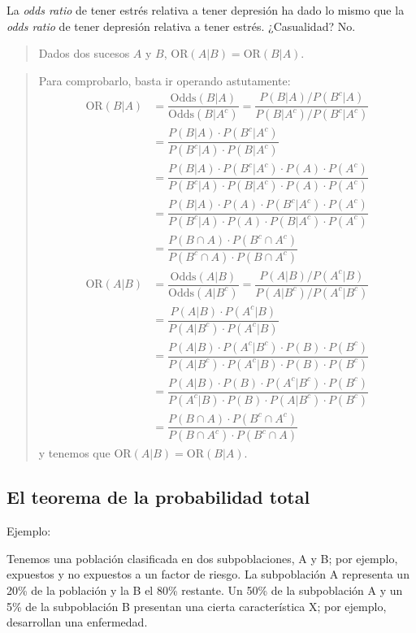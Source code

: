 \documentclass[
  spanish,
  letterpaper,
  DIV=11,
  numbers=noendperiod]{scrreprt}
\begin{document}
\begin{tcolorbox}
La \emph{odds ratio} de tener estrés relativa a tener depresión ha dado
lo mismo que la \emph{odds ratio} de tener depresión relativa a tener
estrés. ¿Casualidad? No.

\begin{quote}
Dados dos sucesos \(A\) y \(B\), \(\text{OR}(A|B)=\text{OR}(B|A)\).
\end{quote}

\begin{quote}
Para comprobarlo, basta ir operando astutamente: \[
\begin{array}{l}
\text{OR}(B|A)\!\!\!\!\! &= \dfrac{\text{Odds}(B|A)}{\text{Odds}(B|A^c)}  = \dfrac{P(B|A)/P(B^c|A)}{P(B|A^c)/P(B^c|A^c)}\\
&=\dfrac{P(B|A)\cdot P(B^c|A^c)}{P(B^c|A)\cdot P(B|A^c)}\\
& =\dfrac{P(B|A)\cdot P(B^c|A^c)\cdot P(A)\cdot P(A^c)}{P(B^c|A)\cdot P(B|A^c)\cdot P(A)\cdot P(A^c)}\\
& =\dfrac{P(B|A)\cdot P(A)\cdot P(B^c|A^c)\cdot P(A^c)}{P(B^c|A)\cdot P(A)\cdot P(B|A^c)\cdot P(A^c)}\\
& =\dfrac{P(B\cap A)\cdot P(B^c\cap A^c)}{P(B^c\cap A)\cdot P(B\cap A^c)}\\
\text{OR}(A|B) & = \dfrac{\text{Odds}(A|B)}{\text{Odds}(A|B^c)} =\dfrac{P(A|B)/P(A^c|B)}{P(A|B^c)/P(A^c|B^c)}\\
& =\dfrac{P(A|B)\cdot P(A^c|B)}{P(A|B^c)\cdot P(A^c|B)}\\
& =\dfrac{P(A|B)\cdot P(A^c|B^c)\cdot P(B)\cdot P(B^c)}{P(A|B^c)\cdot P(A^c|B)\cdot P(B)\cdot P(B^c)}\\
& =\dfrac{P(A|B)\cdot P(B)\cdot P(A^c|B^c)\cdot P(B^c)}{P(A^c|B)\cdot P(B)\cdot P(A|B^c)\cdot P(B^c)}\\
& =\dfrac{P(B\cap A)\cdot P(B^c\cap A^c)}{P(B\cap A^c)\cdot P(B^c\cap A)}
\end{array}
\] y tenemos que \(\text{OR}(A|B)=\text{OR}(B|A)\).
\end{quote}

\subsection{El teorema de la probabilidad
total}\label{el-teorema-de-la-probabilidad-total}

Ejemplo:

Tenemos una población clasificada en dos subpoblaciones, A y B; por
ejemplo, expuestos y no expuestos a un factor de riesgo. La subpoblación
A representa un 20\% de la población y la B el 80\% restante. Un 50\% de
la subpoblación A y un 5\% de la subpoblación B presentan una cierta
característica X; por ejemplo, desarrollan una enfermedad.


\end{tcolorbox}
\end{document}
